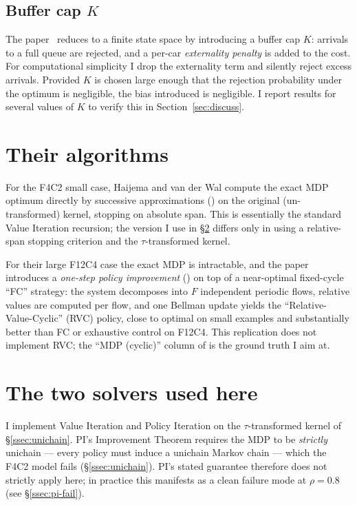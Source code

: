 \documentclass[11pt,a4paper]{article}
\begin{document}
\subsection{Buffer cap $K$}
\label{ssec:cap}

The paper~\cite[\S 3.5]{haijema2008} reduces to a finite state space
by introducing a buffer cap $K$: arrivals to a full queue are
rejected, and a per-car \emph{externality penalty} is added to the
cost. For computational simplicity I drop the externality term and
silently reject excess arrivals. Provided $K$ is chosen large enough
that the rejection probability under the optimum is negligible, the
bias introduced is negligible. I report results for several values
of $K$ to verify this in Section~\ref{sec:discuss}.

\section{Their algorithms}
\label{sec:their}

For the F4C2 small case, Haijema and van der Wal compute the exact
MDP optimum directly by successive approximations
(\cite[\S 3.6]{haijema2008}) on the original (un-transformed) kernel,
stopping on absolute span. This is essentially the standard Value
Iteration recursion; the version I use in \S\ref{sec:our} differs
only in using a relative-span stopping criterion and the
$\tau$-transformed kernel.

For their large F12C4 case the exact MDP is intractable, and the
paper introduces a \emph{one-step policy improvement}
(\cite[\S 4]{haijema2008}) on top of a near-optimal fixed-cycle ``FC''
strategy: the system decomposes into $F$ independent periodic flows,
relative values are computed per flow, and one Bellman update yields
the ``Relative-Value-Cyclic'' (RVC) policy, close to optimal on small
examples and substantially better than FC or exhaustive control on
F12C4. This replication does not implement RVC; the ``MDP (cyclic)''
column of \cite[Table~1]{haijema2008} is the ground truth I aim at.

\section{The two solvers used here}
\label{sec:our}

I implement Value Iteration and Policy Iteration on the
$\tau$-transformed kernel of \S\ref{ssec:unichain}. PI's Improvement
Theorem requires the MDP to be \emph{strictly} unichain --- every
policy must induce a unichain Markov chain --- which the F4C2 model
fails (\S\ref{ssec:unichain}). PI's stated guarantee therefore does
not strictly apply here; in practice this manifests as a clean failure
mode at $\rho = 0.8$ (see \S\ref{ssec:pi-fail}).
\end{document}
